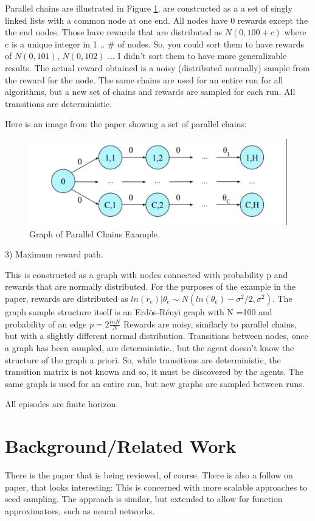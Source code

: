 \documentclass{article}
\begin{document}
Parallel chains are illustrated in Figure \ref{fig:parallelchains}, are constructed as a a set of singly linked lists with a common node at one end. All nodes have 0 rewards except the the end nodes. Those have  rewards that are distributed as $N(0,100+c)$ where c is a unique integer in 1 .. \# of nodes. So, you could sort them to have rewards of $N(0,101)$, $N(0,102)$ ... I didn't sort them to have more generalizable results. The actual reward obtained is a noisy (distributed normally) sample from the reward for the node.  The same chains are used for an entire run for all algorithms, but a new set of chains and rewards are sampled for each run. All transitions are deterministic.

Here is an image from the paper showing a set of parallel chains:

\begin{figure}[htbp!]
  \centering
\includegraphics[scale=.25]{parallelchains.png}

  \caption{Graph of Parallel Chains Example.}
 \label{fig:parallelchains}
\end{figure}
3) Maximum reward path. 

This is constructed as a graph with nodes connected with probability p and rewards that are normally distributed. For the purposes of the example in the paper, rewards are distributed as $ln{(r_e)} | \theta_e \sim N(ln{(\theta_e)} - \sigma^2/2,\sigma^2)$. The graph sample structure itself is an Erd\~os-R\'enyi graph with N =100 and probability of an edge $p=2 \frac{ln N}{N}$ Rewards are noisy, similarly to parallel chains, but with a slightly different normal distribution. Transitions between nodes, once a graph has been sampled, are deterministic., but the agent doesn't know the structure of the graph a priori. So, while transitions are deterministic, the transition matrix is not known and so, it must be discovered by the agents. The same graph is used for an entire run, but new graphs are sampled between runs.

All episodes are finite horizon.

\section{Background/Related Work}
There is the paper that is being reviewed, of course. There is also a follow on paper, that looks interesting: \cite{SCALSS} This is concerned with more scalable approaches to seed sampling. The approach is similar, but extended to allow for function approximators, such as neural networks.
\end{document}
